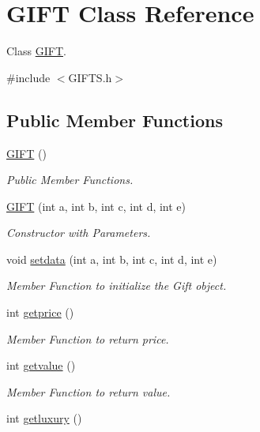 \hypertarget{class_g_i_f_t}{}\section{G\+I\+FT Class Reference}
\label{class_g_i_f_t}


Class \hyperlink{class_g_i_f_t}{G\+I\+FT}.  




{\ttfamily \#include $<$G\+I\+F\+T\+S.\+h$>$}

\subsection*{Public Member Functions}
\begin{DoxyCompactItemize}
\item 
\hyperlink{class_g_i_f_t_a7ffd64aabe995e6fa927cef8dd874505}{G\+I\+FT} ()
\begin{DoxyCompactList}\small\item\em Public Member Functions. \end{DoxyCompactList}\item 
\hyperlink{class_g_i_f_t_aaeda596c19a7738a83bf3046613b0eab}{G\+I\+FT} (int a, int b, int c, int d, int e)
\begin{DoxyCompactList}\small\item\em Constructor with Parameters. \end{DoxyCompactList}\item 
void \hyperlink{class_g_i_f_t_a5b03bf798de4b0716fb4438ce2b44f20}{setdata} (int a, int b, int c, int d, int e)
\begin{DoxyCompactList}\small\item\em Member Function to initialize the Gift object. \end{DoxyCompactList}\item 
int \hyperlink{class_g_i_f_t_a19425237ca27e9582d8e0a4573ef92c6}{getprice} ()
\begin{DoxyCompactList}\small\item\em Member Function to return price. \end{DoxyCompactList}\item 
int \hyperlink{class_g_i_f_t_a5d9dd7971200e465b5d476cca993f734}{getvalue} ()
\begin{DoxyCompactList}\small\item\em Member Function to return value. \end{DoxyCompactList}\item 
int \hyperlink{class_g_i_f_t_a65c3cc597b9c9b588d015ce07aec06a0}{getluxury} ()

\end{DoxyCompactItemize}
